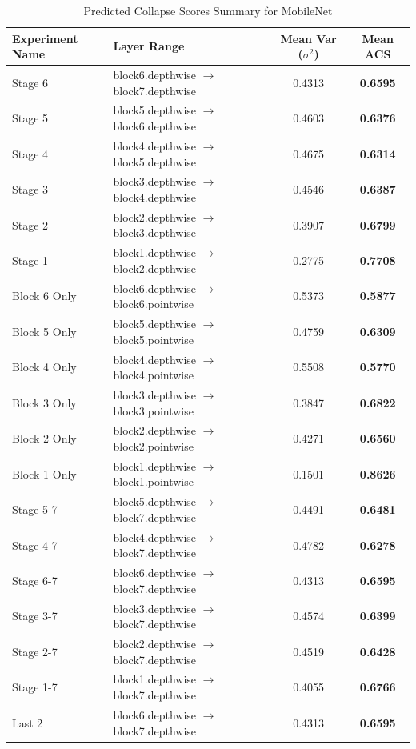 \begin{table}[h]
\caption{Predicted Collapse Scores Summary for MobileNet}
\label{tab:acs_summary_mobilenet}
\begin{tabular}{llcc}
\toprule
Experiment Name & Layer Range & Mean Var ($\sigma^2$) & Mean ACS \\
\midrule
Stage 6 & block6.depthwise $\to$ block7.depthwise & 0.4313 & \textbf{0.6595} \\
Stage 5 & block5.depthwise $\to$ block6.depthwise & 0.4603 & \textbf{0.6376} \\
Stage 4 & block4.depthwise $\to$ block5.depthwise & 0.4675 & \textbf{0.6314} \\
Stage 3 & block3.depthwise $\to$ block4.depthwise & 0.4546 & \textbf{0.6387} \\
Stage 2 & block2.depthwise $\to$ block3.depthwise & 0.3907 & \textbf{0.6799} \\
Stage 1 & block1.depthwise $\to$ block2.depthwise & 0.2775 & \textbf{0.7708} \\
Block 6 Only & block6.depthwise $\to$ block6.pointwise & 0.5373 & \textbf{0.5877} \\
Block 5 Only & block5.depthwise $\to$ block5.pointwise & 0.4759 & \textbf{0.6309} \\
Block 4 Only & block4.depthwise $\to$ block4.pointwise & 0.5508 & \textbf{0.5770} \\
Block 3 Only & block3.depthwise $\to$ block3.pointwise & 0.3847 & \textbf{0.6822} \\
Block 2 Only & block2.depthwise $\to$ block2.pointwise & 0.4271 & \textbf{0.6560} \\
Block 1 Only & block1.depthwise $\to$ block1.pointwise & 0.1501 & \textbf{0.8626} \\
Stage 5-7 & block5.depthwise $\to$ block7.depthwise & 0.4491 & \textbf{0.6481} \\
Stage 4-7 & block4.depthwise $\to$ block7.depthwise & 0.4782 & \textbf{0.6278} \\
Stage 6-7 & block6.depthwise $\to$ block7.depthwise & 0.4313 & \textbf{0.6595} \\
Stage 3-7 & block3.depthwise $\to$ block7.depthwise & 0.4574 & \textbf{0.6399} \\
Stage 2-7 & block2.depthwise $\to$ block7.depthwise & 0.4519 & \textbf{0.6428} \\
Stage 1-7 & block1.depthwise $\to$ block7.depthwise & 0.4055 & \textbf{0.6766} \\
Last 2 & block6.depthwise $\to$ block7.depthwise & 0.4313 & \textbf{0.6595} \\
\bottomrule
\end{tabular}
\end{table}
